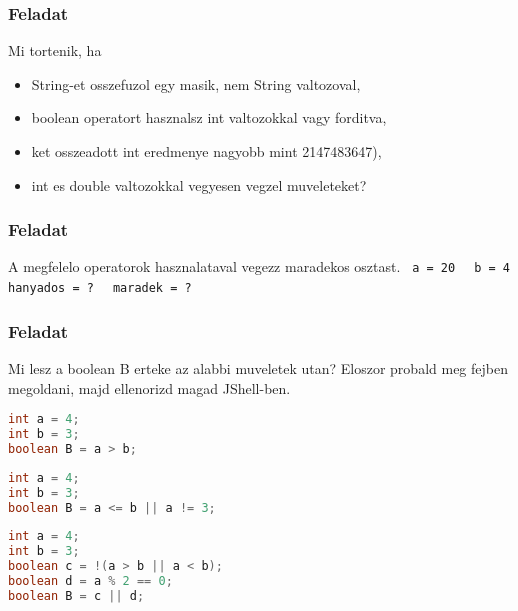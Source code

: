 \documentclass{article}
\begin{document}
\subsubsection{Feladat}

Mi tortenik, ha
\begin{itemize}
    \item String-et osszefuzol egy masik, nem String valtozoval,
    \item boolean operatort hasznalsz int valtozokkal vagy forditva,
    \item ket osszeadott int eredmenye nagyobb mint 2147483647),
    \item int es double valtozokkal vegyesen vegzel muveleteket?
\end{itemize}

\subsubsection{Feladat}

A megfelelo operatorok hasznalataval vegezz maradekos osztast.\newline
\lstinline[mathescape]{ a = 20 }\newline
\lstinline[mathescape]{ b = 4 }\newline
\lstinline[mathescape]{ hanyados = ? }\newline
\lstinline[mathescape]{ maradek = ? }\newline

\subsubsection{Feladat}

Mi lesz a boolean B erteke az alabbi muveletek utan? Eloszor probald meg fejben megoldani, majd ellenorizd magad JShell-ben.

\begin{lstlisting}[language=Java, caption=Muvelet 1.]
int a = 4;
int b = 3;
boolean B = a > b;
\end{lstlisting}

\begin{lstlisting}[language=Java, caption=Muvelet 2.]
int a = 4;
int b = 3;
boolean B = a <= b || a != 3;
\end{lstlisting}

\begin{lstlisting}[language=Java, caption=Muvelet 3.]
int a = 4;
int b = 3;
boolean c = !(a > b || a < b);
boolean d = a % 2 == 0;
boolean B = c || d;
\end{lstlisting}
\end{document}
